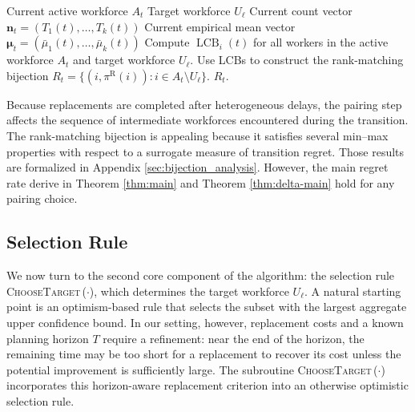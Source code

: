 \documentclass[opre,blindrev]{informs3}
\newcommand{\LCB}{\operatorname{LCB}}
\newcommand{\ChooseTarget}{\textsc{ChooseTarget}\,}
\begin{document}
\begin{algorithm}
    \caption{ConstructPairing}
    \label{alg:ConstructPairing}
    \begin{algorithmic}[1]
        \Require Current active workforce \(A_t\)
        \Require Target workforce \(U_{\ell}\)
        \Require Current count vector \(\mathbf{n}_t=(T_1(t),\dots,T_k(t))\)
        \Require Current empirical mean vector \(\boldsymbol{\mu}_t=(\bar{\mu}_1(t),\dots,\bar{\mu}_k(t))\)
        \State Compute \(\LCB_i(t)\) for all workers in the active workforce \(A_t\) and target workforce \(U_{\ell}\).
        \State Use LCBs to construct the rank-matching bijection \(R_t = \{  (i,\pi^{\mathrm{R}}(i)) : i \in  A_{t}\setminus U_{\ell}  \}\).
        \State \Return  \(R_t\).
    \end{algorithmic}
\end{algorithm}
Because replacements are completed after heterogeneous delays, the pairing step affects the sequence of intermediate workforces encountered during the transition. The rank-matching bijection is appealing because it satisfies several min--max properties with respect to a surrogate measure of transition regret. Those results are formalized in Appendix \ref{sec:bijection_analysis}. However, the main regret rate derive in Theorem \ref{thm:main} and Theorem \ref{thm:delta-main} hold for any pairing choice.

\subsection{Selection Rule}
We now turn to the second core component of the algorithm: the selection rule \ChooseTarget(\(\cdot\)), which determines the target workforce \(U_\ell\). A natural starting point is an optimism-based rule that selects the subset with the largest aggregate upper confidence bound. In our setting, however, replacement costs and a known planning horizon \(T\) require a refinement: near the end of the horizon, the remaining time may be too short for a replacement to recover its cost unless the potential improvement is sufficiently large. The subroutine \ChooseTarget(\(\cdot\)) incorporates this horizon-aware replacement criterion into an otherwise optimistic selection rule.
\end{document}
